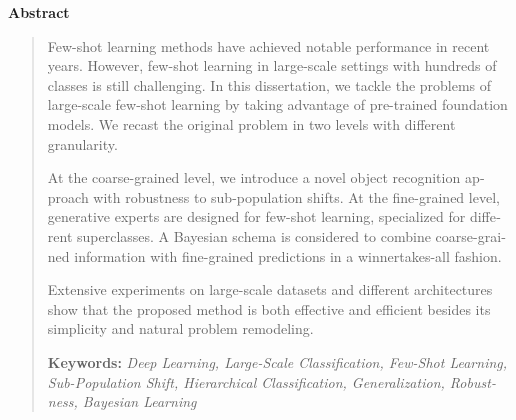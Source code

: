 \thispagestyle{empty} 

\begin{latin}
\centerline{\textbf{\large{Abstract}}}
\begin{quote}
	
Few-shot learning methods have achieved notable performance in recent years.
However, few-shot learning in large-scale settings with hundreds of classes is still
challenging. In this dissertation, we tackle the problems of large-scale few-shot learning
by taking advantage of pre-trained foundation models. We recast the original
problem in two levels with different granularity.

At the coarse-grained level, we
introduce a novel object recognition approach with robustness to sub-population
shifts. At the fine-grained level, generative experts are designed for few-shot
learning, specialized for different superclasses. 
A Bayesian schema is considered
to combine coarse-grained information with fine-grained predictions in a winnertakes-all fashion. 

Extensive experiments on large-scale datasets and different
architectures show that the proposed method is both effective and efficient besides
its simplicity and natural problem remodeling.


\vskip 1cm
\textbf{Keywords:} \textit{Deep Learning, Large-Scale Classification, Few-Shot Learning, Sub-Population Shift, Hierarchical Classification, Generalization, Robustness, Bayesian Learning}
\end{quote}
\end{latin}

